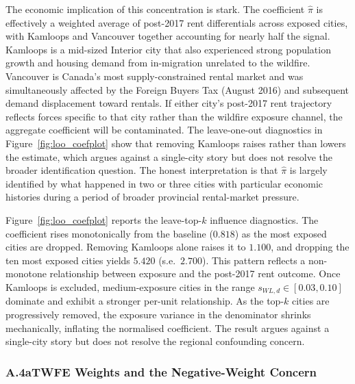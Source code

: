 \documentclass[12pt]{article}
\begin{document}
The economic implication of this concentration is stark. The coefficient
$\hat\pi$ is effectively a weighted average of post-2017 rent differentials
across exposed cities, with Kamloops and Vancouver together accounting for
nearly half the signal. Kamloops is a mid-sized Interior city that also
experienced strong population growth and housing demand from in-migration
unrelated to the wildfire. Vancouver is Canada's most supply-constrained
rental market and was simultaneously affected by the Foreign Buyers Tax
(August 2016) and subsequent demand displacement toward rentals. If either
city's post-2017 rent trajectory reflects forces specific to that city rather
than the wildfire exposure channel, the aggregate coefficient will be
contaminated. The leave-one-out diagnostics in Figure~\ref{fig:loo_coefplot}
show that removing Kamloops raises rather than lowers the estimate, which
argues against a single-city story but does not resolve the broader
identification question. The honest interpretation is that $\hat\pi$ is
largely identified by what happened in two or three cities with particular
economic histories during a period of broader provincial rental-market
pressure.

Figure~\ref{fig:loo_coefplot} reports the leave-top-$k$ influence diagnostics.
The coefficient rises monotonically from the baseline ($0.818$) as the most
exposed cities are dropped. Removing Kamloops alone raises it to $1.100$, and
dropping the ten most exposed cities yields $5.420$ (s.e.\ $2.700$). This
pattern reflects a non-monotone relationship between exposure and the
post-2017 rent outcome. Once Kamloops is excluded, medium-exposure cities
in the range $s_{WL,d}\in[0.03,0.10]$ dominate and exhibit a stronger
per-unit relationship. As the top-$k$ cities are progressively removed, the
exposure variance in the denominator shrinks mechanically, inflating the
normalised coefficient. The result argues against a single-city story but does
not resolve the regional confounding concern.

\subsubsection*{A.4a\quad TWFE Weights and the Negative-Weight Concern}
\label{app:twfe_weights}
\end{document}
